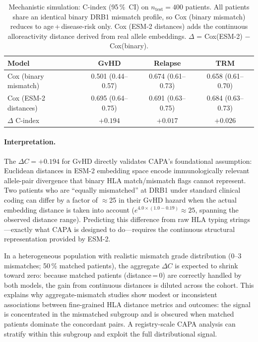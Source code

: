 \documentclass[11pt,a4paper]{article}
\begin{document}
\begin{table}[ht]
\centering
\caption{Mechanistic simulation: C-index (95\,\%~CI) on $n_{\mathrm{test}}=400$ patients.
All patients share an identical binary DRB1 mismatch profile, so Cox (binary
mismatch) reduces to age\,+\,disease-risk only.  Cox (ESM-2 distances) adds the
continuous alloreactivity distance derived from real allele embeddings.
$\Delta$ = Cox(ESM-2) $-$ Cox(binary).}
\label{tab:mechanistic}
\smallskip
\begin{tabular}{lccc}
\toprule
Model & GvHD & Relapse & TRM \\
\midrule
Cox (binary mismatch) & 0.501 (0.44--0.57) & 0.674 (0.61--0.73) & 0.658 (0.61--0.70) \\
Cox (ESM-2 distances) & 0.695 (0.64--0.75) & 0.691 (0.63--0.75) & 0.684 (0.63--0.73) \\
\midrule
$\Delta$ C-index      & $\mathbf{+0.194}$ & $+0.017$ & $+0.026$ \\
\bottomrule
\end{tabular}
\end{table}

\paragraph{Interpretation.}
The $\Delta C = +0.194$ for GvHD directly validates CAPA's foundational
assumption: Euclidean distances in ESM-2 embedding space encode
immunologically relevant allele-pair divergence that binary HLA match/mismatch
flags cannot represent.  Two patients who are ``equally mismatched'' at DRB1
under standard clinical coding can differ by a factor of $\approx$25 in their
GvHD hazard when the actual embedding distance is taken into account
($e^{4.0 \times (1.0 - 0.19)} \approx 25$, spanning the observed distance range).  Predicting this difference from
raw HLA typing strings---exactly what CAPA is designed to do---requires the
continuous structural representation provided by ESM-2.

In a heterogeneous population with realistic mismatch grade distribution
(0--3 mismatches; 50\,\% matched patients), the aggregate $\Delta C$ is
expected to shrink toward zero: because matched patients (distance\,=\,0) are
correctly handled by both models, the gain from continuous distances is diluted
across the cohort.  This explains why
aggregate-mismatch studies show modest or inconsistent associations between
fine-grained HLA distance metrics and outcomes: the signal is concentrated in
the mismatched subgroup and is obscured when matched patients dominate the
concordant pairs.  A registry-scale CAPA analysis can stratify within this
subgroup and exploit the full distributional signal.
\end{document}
